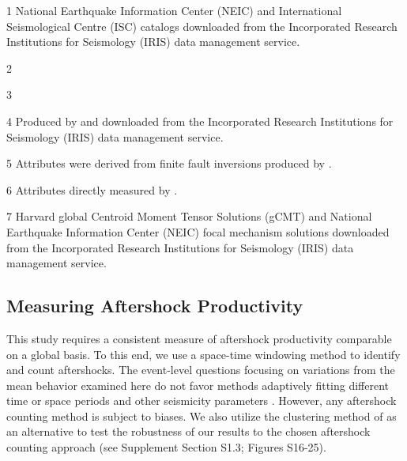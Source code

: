 \documentclass[draft, jgrga]{agujournal2018}
\begin{document}
\begin{table}[]
\begin{threeparttable}
    \begin{tablenotes}
        \item[1] National Earthquake Information Center (NEIC) and International Seismological Centre (ISC) catalogs downloaded from the Incorporated Research Institutions for Seismology (IRIS) data management service.
        \item[2] \citet{Bird2003AnBoundaries}
        \item[3] \citet{Muller2008}
        \item[4] Produced by \citet{Convers2011GlobalMid2010} and downloaded from the Incorporated Research Institutions for Seismology (IRIS) data management service.
        \item[5] Attributes were derived from finite fault inversions produced by \citet{Hayes2017}.
        \item[6] Attributes directly measured by \citet{Hayes2017}.
        \item[7] Harvard global Centroid Moment Tensor Solutions (gCMT) and National Earthquake Information Center (NEIC) focal mechanism solutions downloaded from the Incorporated Research Institutions for Seismology (IRIS) data management service.

    \end{tablenotes}

\end{threeparttable}

\end{table}



    \subsection{Measuring Aftershock Productivity}

This study requires a consistent measure of aftershock productivity comparable on a global basis. To this end, we use a space-time windowing method to identify and count aftershocks. The event-level questions focusing on variations from the mean behavior examined here do not favor methods adaptively fitting different time or space periods and other seismicity parameters \citep[e.g.][]{ogata2017statistics}. However, any aftershock counting method is subject to biases. We also utilize the clustering method of \citet{Zaliapin2008} as an alternative to test the robustness of our results to the chosen aftershock counting approach (see Supplement Section S1.3; Figures S16-25).
\end{document}
